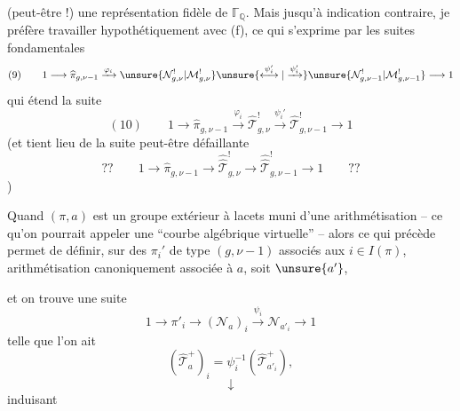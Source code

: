 (peut-être !) une représentation fidèle de $\mathbb{\Gamma}_{\mathbb Q}$. Mais jusqu'à indication contraire, je préfère travailler hypothétiquement avec (f), ce qui s'exprime par les suites  fondamentales
\[
(9)\qquad
1\longrightarrow\widehat{\pi}_{g,\nu-1}
\xrightarrow{\varphi_i}
\unsure{\mathcal N_{g,\nu}^{!}|\mathcal M_{g,\nu}^{!}}
\unsure{\overset{\psi_i'}{\longleftrightarrow}|\xrightarrow{\psi_i'}}
\unsure{\mathcal N_{g,\nu-1}^{!}|\mathcal M_{g,\nu-1}^{!}}
\longrightarrow1
\]
qui étend la suite 
\[
(10)\qquad
1\longrightarrow\widehat{\pi}_{g,\nu-1}
\xrightarrow{\varphi_i}
\widehat{\mathcal T}_{g,\nu}^{!}
\xrightarrow{\psi_i'}
\widehat{\mathcal T}_{g,\nu-1}^{!}
\longrightarrow1
\]
(et tient lieu de la suite  peut-être défaillante
\[
??\qquad
1\longrightarrow\widehat{\pi}_{g,\nu-1}
\longrightarrow\widehat{\widehat{\mathcal T}}_{g,\nu}^{!}
\longrightarrow\widehat{\widehat{\mathcal T}}_{g,\nu-1}^{!}
\longrightarrow1
\qquad??
\]
)

Quand $(\pi,a)$ est un groupe extérieur à lacets muni d'une arithmétisation -- ce qu'on pourrait appeler une ``courbe algébrique virtuelle'' -- alors ce qui précède permet de définir, sur  des $\pi_i'$ de type $(g,\nu-1)$ associés aux $i\in I(\pi)$,  arithmétisation canoniquement associée à $a$, soit $\unsure{a'}$,

et on trouve  une suite 
\[
1 \longrightarrow \pi'_i \longrightarrow (\mathcal{N}_a)_i
\xrightarrow{\psi_i} \mathcal{N}_{a'_i} \longrightarrow 1
\tag{11}
\]
telle que l'on ait
\[
(\widehat{\mathcal{T}}^{+}_a)_i
=\psi_i^{-1}(\widehat{\mathcal{T}}^{+}_{a'_i}),
\tag{12}
\]
\[
\downarrow
\]
induisant


